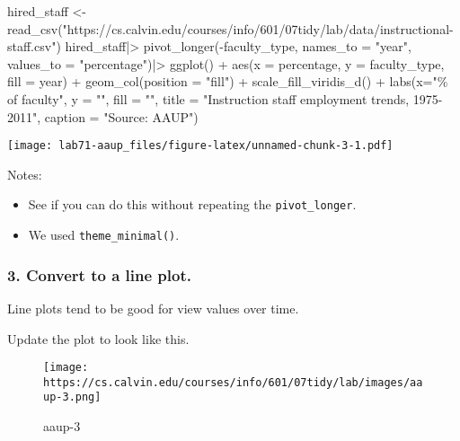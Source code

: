 \documentclass[
]{article}
\newenvironment{Shaded}{\begin{snugshade}}{\end{snugshade}}
\newcommand{\AttributeTok}[1]{\textcolor[rgb]{0.77,0.63,0.00}{#1}}
\newcommand{\FunctionTok}[1]{\textcolor[rgb]{0.00,0.00,0.00}{#1}}
\newcommand{\NormalTok}[1]{#1}
\newcommand{\OtherTok}[1]{\textcolor[rgb]{0.56,0.35,0.01}{#1}}
\newcommand{\SpecialCharTok}[1]{\textcolor[rgb]{0.00,0.00,0.00}{#1}}
\newcommand{\StringTok}[1]{\textcolor[rgb]{0.31,0.60,0.02}{#1}}
\providecommand{\tightlist}{%
  \setlength{\itemsep}{0pt}\setlength{\parskip}{0pt}}
\begin{document}
\begin{Shaded}
\begin{Highlighting}[]
\NormalTok{hired\_staff }\OtherTok{\textless{}{-}} \FunctionTok{read\_csv}\NormalTok{(}\StringTok{"https://cs.calvin.edu/courses/info/601/07tidy/lab/data/instructional{-}staff.csv"}\NormalTok{)}
\NormalTok{hired\_staff}\SpecialCharTok{|\textgreater{}}
  \FunctionTok{pivot\_longer}\NormalTok{(}\SpecialCharTok{{-}}\NormalTok{faculty\_type, }\AttributeTok{names\_to =} \StringTok{"year"}\NormalTok{, }\AttributeTok{values\_to =} \StringTok{"percentage"}\NormalTok{)}\SpecialCharTok{|\textgreater{}}
  \FunctionTok{ggplot}\NormalTok{() }\SpecialCharTok{+}
  \FunctionTok{aes}\NormalTok{(}\AttributeTok{x =}\NormalTok{ percentage, }\AttributeTok{y =}\NormalTok{ faculty\_type, }\AttributeTok{fill =}\NormalTok{ year) }\SpecialCharTok{+}
  \FunctionTok{geom\_col}\NormalTok{(}\AttributeTok{position =} \StringTok{"fill"}\NormalTok{) }\SpecialCharTok{+}
  \FunctionTok{scale\_fill\_viridis\_d}\NormalTok{() }\SpecialCharTok{+}
  \FunctionTok{labs}\NormalTok{(}\AttributeTok{x=}\StringTok{"\% of faculty"}\NormalTok{,}
       \AttributeTok{y =} \StringTok{""}\NormalTok{,}
       \AttributeTok{fill =} \StringTok{""}\NormalTok{,}
       \AttributeTok{title =} \StringTok{"Instruction staff employment trends, 1975{-}2011"}\NormalTok{,}
       \AttributeTok{caption =} \StringTok{"Source: AAUP"}\NormalTok{)}
\end{Highlighting}
\end{Shaded}

\texttt{[image: lab71-aaup\_files/figure-latex/unnamed-chunk-3-1.pdf]}

Notes:

\begin{itemize}
\tightlist
\item
  See if you can do this without repeating the \texttt{pivot\_longer}.
\item
  We used \texttt{theme\_minimal()}.
\end{itemize}

\hypertarget{convert-to-a-line-plot.}{%
\subsubsection{3. Convert to a line
plot.}\label{convert-to-a-line-plot.}}

Line plots tend to be good for view values over time.

Update the plot to look like this.

\begin{figure}
\centering
\texttt{[image: https://cs.calvin.edu/courses/info/601/07tidy/lab/images/aaup-3.png]}
\caption{aaup-3}
\end{figure}
\end{document}

